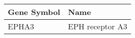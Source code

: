 \begin{tabular}{ll}
\toprule
Gene Symbol &            Name \\
\midrule
      EPHA3 & EPH receptor A3 \\
\bottomrule
\end{tabular}
